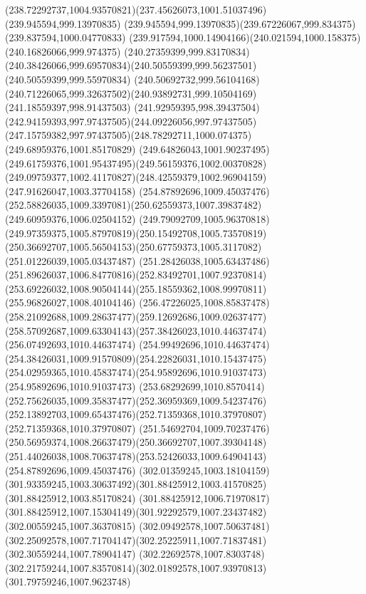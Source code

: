 {{\curveto(238.72292737,1004.93570821)(237.45626073,1001.51037496)(239.945594,999.13970835)
\curveto(239.945594,999.13970835)(239.67226067,999.834375)(239.837594,1000.04770833)
\curveto(239.917594,1000.14904166)(240.021594,1000.158375)(240.16826066,999.974375)
\curveto(240.27359399,999.83170834)(240.38426066,999.69570834)(240.50559399,999.56237501)
\lineto(240.50559399,999.55970834)
\lineto(240.50692732,999.56104168)
\curveto(240.71226065,999.32637502)(240.93892731,999.10504169)(241.18559397,998.91437503)
\curveto(241.92959395,998.39437504)(242.94159393,997.97437505)(244.09226056,997.97437505)
\curveto(247.15759382,997.97437505)(248.78292711,1000.074375)(249.68959376,1001.85170829)
\curveto(249.64826043,1001.90237495)(249.61759376,1001.95437495)(249.56159376,1002.00370828)
\curveto(249.09759377,1002.41170827)(248.42559379,1002.96904159)(247.91626047,1003.37704158)
\moveto(254.87892696,1009.45037476)
\curveto(252.58826035,1009.3397081)(250.62559373,1007.39837482)(249.60959376,1006.02504152)
\curveto(249.79092709,1005.96370818)(249.97359375,1005.87970819)(250.15492708,1005.73570819)
\curveto(250.36692707,1005.56504153)(250.67759373,1005.3117082)(251.01226039,1005.03437487)
\curveto(251.28426038,1005.63437486)(251.89626037,1006.84770816)(252.83492701,1007.92370814)
\curveto(253.69226032,1008.90504144)(255.18559362,1008.99970811)(255.96826027,1008.40104146)
\curveto(256.47226025,1008.85837478)(258.21092688,1009.28637477)(259.12692686,1009.02637477)
\curveto(258.57092687,1009.63304143)(257.38426023,1010.44637474)(256.07492693,1010.44637474)
\curveto(254.99492696,1010.44637474)(254.38426031,1009.91570809)(254.22826031,1010.15437475)
\curveto(254.02959365,1010.45837474)(254.95892696,1010.91037473)(254.95892696,1010.91037473)
\curveto(253.68292699,1010.8570414)(252.75626035,1009.35837477)(252.36959369,1009.54237476)
\curveto(252.13892703,1009.65437476)(252.71359368,1010.37970807)(252.71359368,1010.37970807)
\curveto(251.54692704,1009.70237476)(250.56959374,1008.26637479)(250.36692707,1007.39304148)
\curveto(251.44026038,1008.70637478)(253.52426033,1009.64904143)(254.87892696,1009.45037476)
\moveto(302.01359245,1003.18104159)
\curveto(301.93359245,1003.30637492)(301.88425912,1003.41570825)(301.88425912,1003.85170824)
\lineto(301.88425912,1006.71970817)
\curveto(301.88425912,1007.15304149)(301.92292579,1007.23437482)(302.00559245,1007.36370815)
\curveto(302.09492578,1007.50637481)(302.25092578,1007.71704147)(302.25225911,1007.71837481)
\lineto(302.30559244,1007.78904147)
\lineto(302.22692578,1007.8303748)
\curveto(302.21759244,1007.83570814)(302.01892578,1007.93970813)(301.79759246,1007.9623748)
}}
